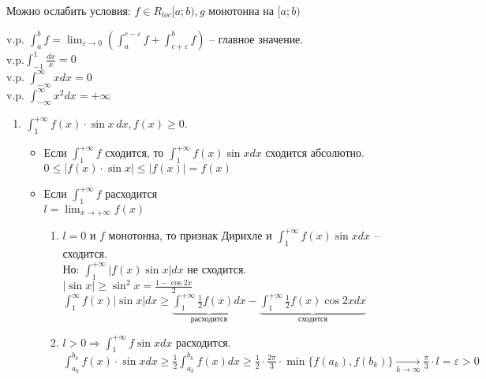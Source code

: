 \begin{Rem}
	Можно ослабить условия: $f \in R_{loc}[a;b), g$ монотонна на $[a;b)$
\end{Rem}

\begin{Def} 
	v.p. $\displaystyle \int_{a}^{b} f = \lim_{\varepsilon \to 0} \left(\int_{a}^{c-\varepsilon} f + \int_{c+\varepsilon}^{b} f  \right)$ -- главное значение.\\
	v.p.$\displaystyle \int_{-1}^{1} \frac{dx}{x} = 0$\\
	v.p. $\displaystyle \int_{-\infty}^{\infty} x dx = 0$\\
	v.p. $\displaystyle \int_{-\infty}^{\infty} x^2 dx = +\infty$
\end{Def} 

\begin{Example}
	\begin{enumerate}
		\item $\displaystyle \int_{1}^{+\infty} f(x) \cdot \sin x \, dx, f(x) \geqslant 0$.\\
		\begin{itemize}
			\item Если $\displaystyle \int_{1}^{+\infty} f$ сходится, то $\displaystyle \int_{1}^{+\infty} f(x) \sin x dx$ сходится абсолютно.\\
			$0 \leqslant |f(x) \cdot \sin x| \leqslant |f(x)| = f(x)$\\
			\item Если $\displaystyle \int_{1}^{+\infty} f$ расходится\\
			$\displaystyle l = \lim_{x \to + \infty} f(x)$

			\begin{enumerate}
				\item $l = 0$ и $f$ монотонна, то признак Дирихле и $\displaystyle \int_{1}^{+\infty} f(x) \sin x dx$ -- сходится.\\
				Но: $\displaystyle \int_{1}^{+\infty} |f(x) \sin x| dx$ не сходится.\\
				$\displaystyle |\sin x| \geqslant \sin^2 x = \frac{1 - \cos 2x}{2}$\\
				$\displaystyle \int_{1}^{\infty} f(x) |\sin x| dx \geqslant \underbrace{\int_{1}^{+\infty} \frac{1}{2}f(x)dx}_{\text{расходится}} - 
				\underbrace{\int_{1}^{+\infty} \frac{1}{2} f(x) \cos 2x dx}_{\text{сходится}}$
				\item $\displaystyle l > 0 \Rightarrow \int_{1}^{+ \infty} f \sin x dx$ расходится.\\
				$\displaystyle \int_{a_k}^{b_k} f(x) \cdot \sin x dx \geqslant \frac{1}{2} \int_{a_k}^{b_k}
				f(x)dx \geqslant \frac{1}{2} \cdot \frac{2 \pi}{3} \cdot \min\{f(a_k), f(b_k)\} 
				\underset{k \to \infty}{\to} \frac{\pi}{3} \cdot l = \varepsilon > 0$
			\end{enumerate}
		\end{itemize}
		

\end{enumerate}
\end{Example}
